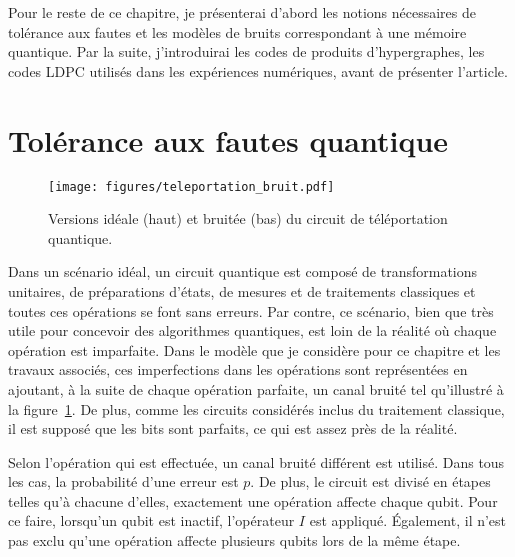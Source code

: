 Pour le reste de ce chapitre,
je présenterai d'abord les notions nécessaires de tolérance aux fautes et les modèles 
de bruits correspondant à une mémoire quantique.
Par la suite,
j'introduirai les codes de produits d'hypergraphes,
les codes LDPC utilisés dans les expériences numériques,
avant de présenter l'article.

\section{Tolérance aux fautes quantique}

\begin{figure}
	\begin{center}
		\texttt{[image: figures/teleportation\_bruit.pdf]}
	\end{center}
	\caption{
		Versions idéale (haut) et bruitée (bas) du circuit de téléportation quantique.
	}
	\label{fig:teleportation_bruit}
\end{figure}

Dans un scénario idéal,
un circuit quantique est composé de transformations unitaires,
de préparations d'états, de mesures et de traitements classiques et toutes ces opérations
se font sans erreurs.
Par contre,
ce scénario,
bien que très utile pour concevoir des algorithmes quantiques,
est loin de la réalité où chaque opération est imparfaite.
Dans le modèle que je considère pour ce chapitre et les travaux associés,
ces imperfections dans les opérations sont représentées en ajoutant,
à la suite de chaque opération parfaite,
un canal bruité tel qu'illustré à la figure~\ref{fig:teleportation_bruit}.
De plus,
comme les circuits considérés inclus du traitement classique,
il est supposé que les bits sont parfaits,
ce qui est assez près de la réalité.

Selon l'opération qui est effectuée,
un canal bruité différent est utilisé.
Dans tous les cas,
la probabilité d'une erreur est $p$.
De plus, 
le circuit est divisé en étapes telles qu'à chacune d'elles,
exactement une opération affecte chaque qubit.
Pour ce faire,
lorsqu'un qubit est inactif,
l'opérateur $I$ est appliqué.
Également,
il n'est pas exclu qu'une opération affecte plusieurs qubits lors de la même étape.

